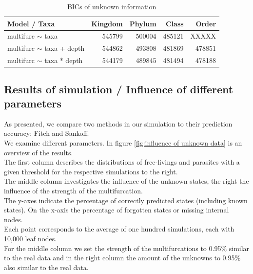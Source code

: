         \begin{table}[h!]
          \begin{center}
            \begin{tabular}{ |l|r|r|r|r| }
              \hline
              Model / Taxa & Kingdom & Phylum & Class & Order \\
              \hline \hline
              multifurc $\sim$ taxa & \cellcolor{green!15}545799 & \cellcolor{green!35}500004 & \cellcolor{green!45}485121 & XXXXX \\
              \hline
              multifurc $\sim$ taxa + depth & \cellcolor{green!15}544862 & \cellcolor{green!40}493808 & \cellcolor{green!45}481869 & \cellcolor{green!50}478851 \\
              \hline
              multifurc $\sim$ taxa * depth & \cellcolor{green!15}544179 & \cellcolor{green!45}489845 & \cellcolor{green!45}481494 & \cellcolor{green!50}478188 \\
              \hline
            \end{tabular} 
          \end{center}
          \caption{BICs of unknown information}
          \label{table:BIC unknown information} 
        \end{table}




    \subsection{Results of simulation / Influence of different parameters}

      As presented, we compare two methods in our simulation to their prediction accuracy: Fitch and 
        Sankoff. \\
      We examine different parameters. In figure \ref{fig:influence of unknown data} is an overview of 
        the results. \\
      The first column describes the distributions of free-livings and parasites with a given threshold 
        for the respective simulations to the right. \\
      The middle column investigates the influence of the unknown states, the right the influence of the 
        strength of the multifurcation. \\
      The y-axes indicate the percentage of correctly predicted states (including known states). On the 
        x-axis the percentage of forgotten states or missing internal nodes. \\
      Each point corresponds to the average of one hundred simulations, each with 10,000 leaf nodes. \\
      For the middle column we set the strength of the multifurcations to 0.95\% similar to the real 
        data and in the right column the amount of the unknowns to 0.95\% also similar to the real data. \\

